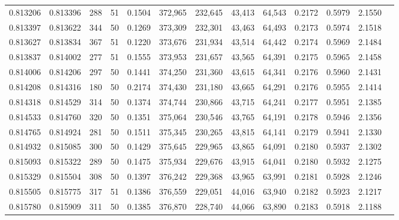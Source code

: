 \begin{tabular}{rrrrrrrrrrrrr}
0.813206 & 0.813396 &   288 &  51 &                                     0.1504 & 372,965 & 232,645 &  43,413 &  64,543 & 0.2172 & 0.5979 & 2.1550 \\
0.813397 & 0.813622 &   344 &  50 &                                     0.1269 & 373,309 & 232,301 &  43,463 &  64,493 & 0.2173 & 0.5974 & 2.1518 \\
0.813627 & 0.813834 &   367 &  51 &                                     0.1220 & 373,676 & 231,934 &  43,514 &  64,442 & 0.2174 & 0.5969 & 2.1484 \\
0.813837 & 0.814002 &   277 &  51 &                                     0.1555 & 373,953 & 231,657 &  43,565 &  64,391 & 0.2175 & 0.5965 & 2.1458 \\
0.814006 & 0.814206 &   297 &  50 &                                     0.1441 & 374,250 & 231,360 &  43,615 &  64,341 & 0.2176 & 0.5960 & 2.1431 \\
0.814208 & 0.814316 &   180 &  50 &                                     0.2174 & 374,430 & 231,180 &  43,665 &  64,291 & 0.2176 & 0.5955 & 2.1414 \\
0.814318 & 0.814529 &   314 &  50 &                                     0.1374 & 374,744 & 230,866 &  43,715 &  64,241 & 0.2177 & 0.5951 & 2.1385 \\
0.814533 & 0.814760 &   320 &  50 &                                     0.1351 & 375,064 & 230,546 &  43,765 &  64,191 & 0.2178 & 0.5946 & 2.1356 \\
0.814765 & 0.814924 &   281 &  50 &                                     0.1511 & 375,345 & 230,265 &  43,815 &  64,141 & 0.2179 & 0.5941 & 2.1330 \\
0.814932 & 0.815085 &   300 &  50 &                                     0.1429 & 375,645 & 229,965 &  43,865 &  64,091 & 0.2180 & 0.5937 & 2.1302 \\
0.815093 & 0.815322 &   289 &  50 &                                     0.1475 & 375,934 & 229,676 &  43,915 &  64,041 & 0.2180 & 0.5932 & 2.1275 \\
0.815329 & 0.815504 &   308 &  50 &                                     0.1397 & 376,242 & 229,368 &  43,965 &  63,991 & 0.2181 & 0.5928 & 2.1246 \\
0.815505 & 0.815775 &   317 &  51 &                                     0.1386 & 376,559 & 229,051 &  44,016 &  63,940 & 0.2182 & 0.5923 & 2.1217 \\
0.815780 & 0.815909 &   311 &  50 &                                     0.1385 & 376,870 & 228,740 &  44,066 &  63,890 & 0.2183 & 0.5918 & 2.1188 \\

\end{tabular}
